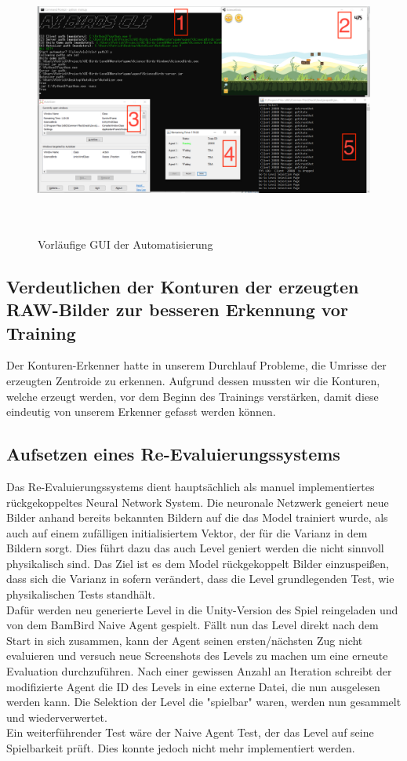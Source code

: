 \begin{figure}
	\centering
	\includegraphics[height=9cm, width=16cm, clip]{img/automator_screen.png}
	\caption{Vorläufige GUI der Automatisierung}
\end{figure}

\subsection{Verdeutlichen der Konturen der erzeugten RAW-Bilder zur besseren Erkennung vor Training}
Der Konturen-Erkenner hatte in unserem Durchlauf Probleme, die Umrisse der erzeugten Zentroide zu erkennen. Aufgrund dessen mussten wir die Konturen, welche erzeugt werden, vor dem Beginn des Trainings verstärken, damit diese eindeutig von unserem Erkenner gefasst werden können. 

\subsection{Aufsetzen eines Re-Evaluierungssystems}
\label{section:reeval}
Das Re-Evaluierungssystems dient hauptsächlich als manuel implementiertes rückgekoppeltes Neural Network System. 
Die neuronale Netzwerk geneiert neue Bilder anhand bereits
bekannten Bildern auf die das Model trainiert wurde, als auch auf einem zufälligen initialisiertem Vektor, der für die Varianz in dem Bildern sorgt. Dies führt dazu das auch Level geniert werden die nicht sinnvoll physikalisch sind. Das Ziel ist es dem Model rückgekoppelt Bilder einzuspeißen, dass sich die Varianz in sofern verändert, dass die Level grundlegenden Test, wie physikalischen Tests standhält. \\
Dafür werden neu generierte Level in die Unity-Version des Spiel reingeladen und von dem BamBird Naive Agent gespielt. Fällt nun das Level direkt nach dem Start in sich zusammen, kann der Agent seinen ersten/nächsten Zug nicht evaluieren und versuch neue Screenshots des Levels zu machen um eine erneute Evaluation durchzuführen. Nach einer gewissen Anzahl an Iteration schreibt der modifizierte Agent die ID des Levels in eine externe Datei, die nun ausgelesen werden kann. Die Selektion der Level die "spielbar" waren, werden nun gesammelt und wiederverwertet. \\
Ein weiterführender Test wäre der Naive Agent Test, der das Level auf seine Spielbarkeit prüft. Dies konnte jedoch nicht mehr implementiert werden.


